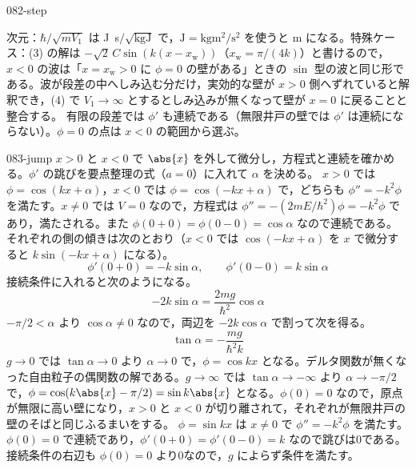 \documentclass[uplatex,dvipdfmx,a4paper,11pt]{jsarticle}
\begin{document}
\begin{kaisetsu}{082-step}
\begin{ronten}
\end{ronten}
\kenzan 次元：$\hbar/\sqrt{mV_{1}}$ は \unit{\joule\second}$/\sqrt{\unit{\kilogram\joule}}$ で，$\unit{\joule}=\unit{\kilogram\metre\squared\per\second\squared}$ を使うと \unit{\metre} になる。特殊ケース：(3) の解は $-\sqrt{2}\,C\sin(k(x-x_{\mathrm{w}}))$（$x_{\mathrm{w}}=\pi/(4k)$）と書けるので，$x<0$ の波は「$x=x_{\mathrm{w}}>0$ に $\phi=0$ の壁がある」ときの $\sin$ 型の波と同じ形である。波が段差の中へしみ込む分だけ，実効的な壁が $x>0$ 側へずれていると解釈でき，(4) で $V_{1}\to\infty$ とするとしみ込みが無くなって壁が $x=0$ に戻ることと整合する。
\tsumazuki 有限の段差では $\phi'$ も連続である（無限井戸の壁では $\phi'$ は連続にならない）。$\phi=0$ の点は $x<0$ の範囲から選ぶ。
\end{kaisetsu}

\begin{kaisetsu}{083-jump}
\houshin $x>0$ と $x<0$ で $\abs{x}$ を外して微分し，方程式と連続を確かめる。$\phi'$ の跳びを要点整理の式（$a=0$）に入れて $\alpha$ を決める。
\keisan
{} $x>0$ では $\phi=\cos(kx+\alpha)$，$x<0$ では $\phi=\cos(-kx+\alpha)$ で，どちらも $\phi''=-k^{2}\phi$ を満たす。$x\ne 0$ では $V=0$ なので，方程式は $\phi''=-(2mE/\hbar^{2})\phi=-k^{2}\phi$ であり，満たされる。また $\phi(0+0)=\phi(0-0)=\cos\alpha$ なので連続である。
 それぞれの側の傾きは次のとおり（$x<0$ では $\cos(-kx+\alpha)$ を $x$ で微分すると $k\sin(-kx+\alpha)$ になる）。
\[ \phi'(0+0)=-k\sin\alpha,\qquad \phi'(0-0)=k\sin\alpha \]
接続条件に入れると次のようになる。
\[ -2k\sin\alpha=\frac{2mg}{\hbar^{2}}\cos\alpha \]
$-\pi/2<\alpha$ より $\cos\alpha\ne 0$ なので，両辺を $-2k\cos\alpha$ で割って次を得る。
\[ \tan\alpha=-\frac{mg}{\hbar^{2}k} \]
 $g\to 0$ では $\tan\alpha\to 0$ より $\alpha\to 0$ で，$\phi=\cos kx$ となる。デルタ関数が無くなった自由粒子の偶関数の解である。$g\to\infty$ では $\tan\alpha\to-\infty$ より $\alpha\to-\pi/2$ で，$\phi=\cos(k\abs{x}-\pi/2)=\sin k\abs{x}$ となる。$\phi(0)=0$ なので，原点が無限に高い壁になり，$x>0$ と $x<0$ が切り離されて，それぞれが無限井戸の壁のそばと同じふるまいをする。
 $\phi=\sin kx$ は $x\ne 0$ で $\phi''=-k^{2}\phi$ を満たす。$\phi(0)=0$ で連続であり，$\phi'(0+0)=\phi'(0-0)=k$ なので跳びは0である。接続条件の右辺も $\phi(0)=0$ より0なので，$g$ によらず条件を満たす。

\end{kaisetsu}
\end{document}
